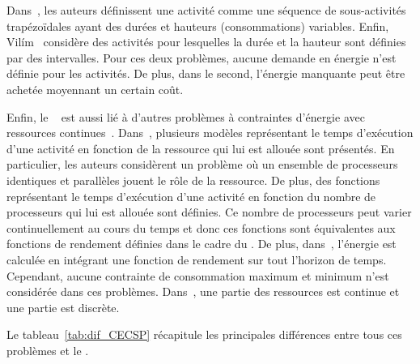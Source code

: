 Dans~\cite{BP}, les auteurs définissent une activité comme une
séquence de sous-activités trapézoïdales ayant des durées et hauteurs
(consommations) variables. Enfin, Vil{\'i}m~\cite{V09} considère des
activités pour lesquelles la durée et la hauteur sont définies par des
intervalles. Pour ces deux problèmes, aucune demande en énergie n'est
définie pour les activités. De plus, dans le second, l'énergie
manquante peut être achetée moyennant un certain coût.

Enfin, le \CECSP~ est aussi lié à d'autres problèmes à contraintes
d'énergie avec ressources continues~\cite{Blaz,Wali}.
Dans~\cite{Blaz}, plusieurs modèles représentant le temps d'exécution
d'une activité en fonction de la ressource qui lui est allouée sont
présentés. En particulier, les auteurs considèrent un problème où 
un ensemble de processeurs identiques et parallèles jouent le rôle de
la ressource. De plus, des fonctions représentant le temps d'exécution
d'une activité en fonction du nombre de processeurs qui lui est
allouée sont définies. Ce nombre de processeurs peut varier
continuellement au cours du temps et donc ces fonctions sont
équivalentes aux fonctions de rendement définies dans le cadre du
\CECSP. De plus, dans~\cite{Blaz,Wali}, l'énergie est calculée en
intégrant une fonction de rendement sur tout l'horizon de temps.
Cependant, aucune contrainte de consommation maximum et minimum n'est
considérée dans ces problèmes. Dans~\cite{Wali}, une partie des
ressources est continue et une partie est discrète.

Le tableau~\ref{tab:dif_CECSP} récapitule les principales différences
entre tous ces problèmes et le \CECSP. 

